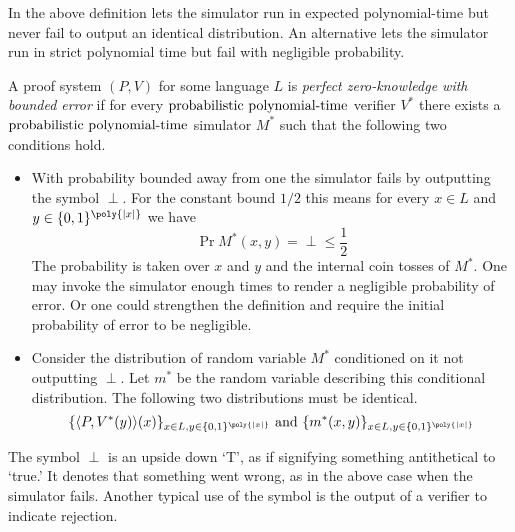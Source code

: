 In the above definition lets the simulator run in expected polynomial-time but never fail to output an identical distribution.
An alternative lets the simulator run in strict polynomial time but fail with negligible probability.

\begin{definition}
    A proof system $(P,V)$ for some language $L$ is \emph{perfect zero-knowledge with bounded error} if for every $\text{probabilistic polynomial-time}$ verifier $V^*$ there exists a $\text{probabilistic polynomial-time}$ simulator $M^*$ such that the following two conditions hold.
    \begin{itemize}
        \item
        With probability bounded away from one the simulator fails by outputting the symbol $\perp$.
        For the constant bound $1/2$ this means for every $x\in L$ and $y\in\{0,1\}^{\poly{|x|}}$ we have
        \begin{equation}
            \Pr{M^*(x,y)=\perp} \leq \frac{1}{2}
        \end{equation}
        The probability is taken over $x$ and $y$ and the internal coin tosses of $M^*$.
        One may invoke the simulator enough times to render a negligible probability of error.
        Or one could strengthen the definition and require the initial probability of error to be negligible.

        \item
        Consider the distribution of random variable $M^*$ conditioned on it not outputting $\perp$.
        Let $m^*$ be the random variable describing this conditional distribution.
        The following two distributions must be identical.
        \begin{equation}
            \{ \langle P, V^*(y) \rangle(x) \}_{x\in L, y\in\{0,1\}^{\poly{|x|}}}
            \text{ and }
            \{ m^*(x,y) \}_{x\in L, y\in\{0,1\}^{\poly{|x|}}}
        \end{equation}
    \end{itemize}
\end{definition}

\begin{remark}
    The symbol $\perp$ is an upside down `T', as if signifying something antithetical to `true.'
    It denotes that something went wrong, as in the above case when the simulator fails.
    Another typical use of the symbol is the output of a verifier to indicate rejection.
\end{remark}

